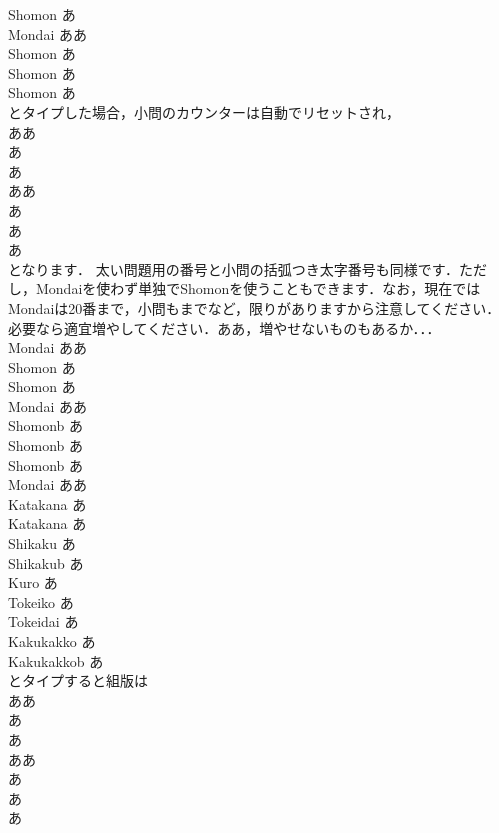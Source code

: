 \documentclass [10pt,fleqn,b5paper]{jsarticlek}
\begin{document}
\yy Shomon あ\yy\yy\\
\yy Mondai ああ\yy\yy\\
\yy Shomon あ\yy\yy\\
\yy Shomon あ\yy\yy\\
\yy Shomon あ\yy\yy\\
とタイプした場合，小問のカウンターは自動でリセットされ，\\
\Mondai ああ\\
\Shomon あ\\
\Shomon あ\\
\Mondai ああ\\
\Shomon あ\\
\Shomon あ\\
\Shomon あ\\
となります．
太い問題用の番号と小問の括弧つき太字番号も同様です．ただし，Mondaiを使わず単独でShomonを使うこともできます．なお，現在ではMondaiは20番まで，小問も\kakkonijyu までなど，限りがありますから注意してください．必要なら適宜増やしてください．ああ，増やせないものもあるか．．．\\
\yy Mondai ああ\yy\yy\\
\yy Shomon あ\yy\yy\\
\yy Shomon あ\yy\yy\\
\yy Mondai ああ\yy\yy\\
\yy Shomonb あ\yy\yy\\
\yy Shomonb あ\yy\yy\\
\yy Shomonb あ\yy\yy\\
\yy Mondai ああ\yy\yy\\
\yy Katakana あ\yy\yy\\
\yy Katakana あ\yy\yy\\
\yy Shikaku あ\yy\yy\\
\yy Shikakub あ\yy\yy\\
\yy Kuro あ\yy\yy\\
\yy Tokeiko あ\yy\yy\\
\yy Tokeidai あ\yy\yy\\
\yy Kakukakko あ\yy\yy\\
\yy Kakukakkob あ\yy\yy\\
とタイプすると組版は\\
\noindent
\Mondai ああ\\
\Shomon あ\\
\Shomon あ\\
\Mondai ああ\\
\Shomonb あ\\
\Shomonb あ\\
\Shomonb あ\\
\end{document}
